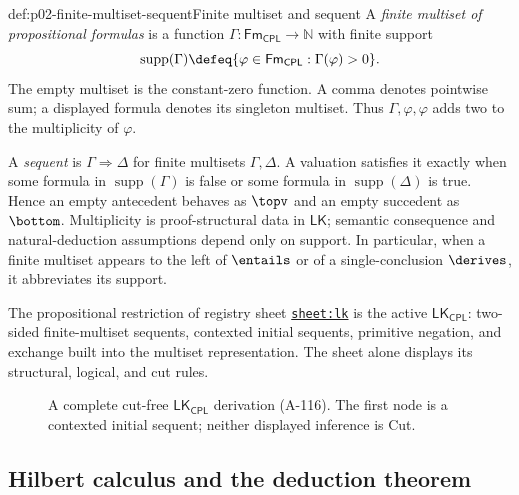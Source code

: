 \begin{hbdefinition}{def:p02-finite-multiset-sequent}{Finite multiset and sequent}
A \emph{finite multiset of propositional formulas} is a function
\(\Gamma:\mathsf{Fm}_{\mathsf{CPL}}\to\mathbb N\) with finite support
\[
 \operatorname{supp}(\Gamma)
 \defeq\{\varphi\in\mathsf{Fm}_{\mathsf{CPL}}:\Gamma(\varphi)>0\}.
\]
The empty multiset is the constant-zero function.  A comma denotes pointwise
sum; a displayed formula denotes its singleton multiset.  Thus
\(\Gamma,\varphi,\varphi\) adds two to the multiplicity of \(\varphi\).

A \emph{sequent} is \(\Gamma\Rightarrow\Delta\) for finite multisets
\(\Gamma,\Delta\).  A valuation satisfies it exactly when some formula in
\(\operatorname{supp}(\Gamma)\) is false or some formula in
\(\operatorname{supp}(\Delta)\) is true.  Hence an empty antecedent behaves
as \(\topv\) and an empty succedent as \(\bottom\).  Multiplicity is
proof-structural data in \(\mathsf{LK}\); semantic consequence and
natural-deduction assumptions depend only on support.  In particular, when a
finite multiset appears to the left of \(\entails\) or of a single-conclusion
\(\derives\), it abbreviates its support.
\end{hbdefinition}

The propositional restriction of registry sheet
\hyperref[sheet:lk]{\texttt{sheet:lk}} is the
active \(\mathsf{LK}_{\mathsf{CPL}}\): two-sided finite-multiset sequents,
contexted initial sequents, primitive negation, and exchange built into the
multiset representation.  The sheet alone displays its structural, logical,
and cut rules.

\begin{figure}[htbp]
\centering
{}
\caption{A complete cut-free \(\mathsf{LK}_{\mathsf{CPL}}\) derivation
(A-116).  The first node is a contexted initial sequent; neither displayed
inference is Cut.}
\label{fig:p02-lk-tree}
\end{figure}

\subsection{Hilbert calculus and the deduction theorem}
\label{sec:p02-hilbert-cpl}

